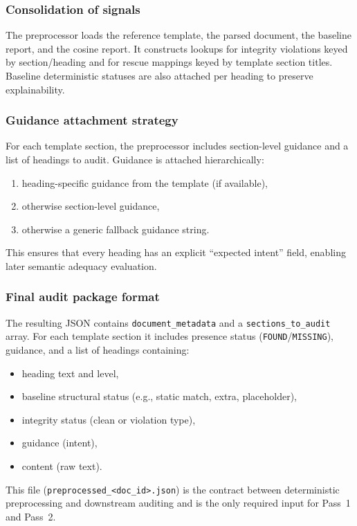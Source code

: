 \subsubsection{Consolidation of signals}
The preprocessor loads the reference template, the parsed document, the baseline report, and the cosine report. It constructs lookups for integrity violations keyed by section/heading and for rescue mappings keyed by template section titles. Baseline deterministic statuses are also attached per heading to preserve explainability.

\subsubsection{Guidance attachment strategy}
For each template section, the preprocessor includes section-level guidance and a list of headings to audit. Guidance is attached hierarchically:
\begin{enumerate}
    \item heading-specific guidance from the template (if available),
    \item otherwise section-level guidance,
    \item otherwise a generic fallback guidance string.
\end{enumerate}
This ensures that every heading has an explicit ``expected intent'' field, enabling later semantic adequacy evaluation.

\subsubsection{Final audit package format}
The resulting JSON contains \texttt{document\_metadata} and a \texttt{sections\_to\_audit} array. For each template section it includes presence status (\texttt{FOUND}/\texttt{MISSING}), guidance, and a list of headings containing:
\begin{itemize}
    \item heading text and level,
    \item baseline structural status (e.g., static match, extra, placeholder),
    \item integrity status (clean or violation type),
    \item guidance (intent),
    \item content (raw text).
\end{itemize}
This file (\texttt{preprocessed\_\textless doc\_id\textgreater.json}) is the contract between deterministic preprocessing and downstream auditing and is the only required input for Pass~1 and Pass~2.

